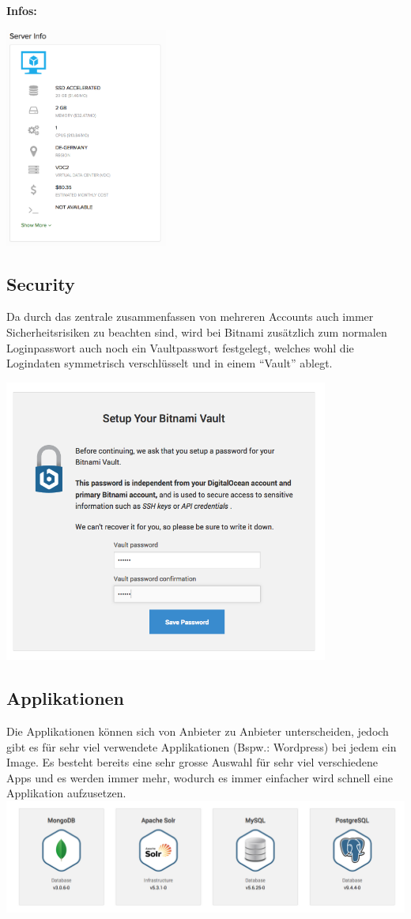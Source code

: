 \documentclass[11pt]{scrartcl}
\begin{document}
\textbf{Infos:}

\includegraphics[width=0.4\textwidth]{vmware_infos}

\subsection{Security}
Da durch das zentrale zusammenfassen von mehreren Accounts auch immer 
Sicherheitsrisiken zu beachten sind, wird bei Bitnami zusätzlich zum normalen 
Loginpasswort auch noch ein Vaultpasswort festgelegt, welches wohl die 
Logindaten symmetrisch verschlüsselt und in einem ``Vault'' ablegt.

\includegraphics[width=0.8\textwidth]{bitnami_security}

\subsection{Applikationen}
Die Applikationen können sich von Anbieter zu Anbieter unterscheiden, jedoch 
gibt es für sehr viel verwendete Applikationen (Bspw.: Wordpress) bei jedem ein 
Image.
Es besteht bereits eine sehr grosse Auswahl für sehr viel verschiedene Apps und 
es werden immer mehr, wodurch es immer einfacher wird schnell eine Applikation 
aufzusetzen.
\includegraphics[width=\textwidth]{apps}
\end{document}
